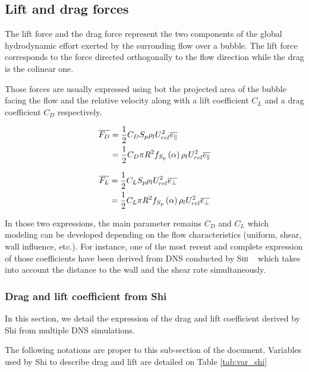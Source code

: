 \subsection{Lift and drag forces}

The lift force and the drag force represent the two components of the global hydrodynamic effort exerted by the surronding flow over a bubble. The lift force corresponds to the force directed orthogonally to the flow direction while the drag is the colinear one. 

\npar
Those forces are usually expressed using bot the projected area of the bubble facing the flow and the relative velocity along with a lift coefficient $C_{L}$ and a drag coefficient $C_{D}$ respectively.


\begin{align}
\overline{F_{D}}&=\frac{1}{2}C_{D}S_{p}\rho_{l}U_{rel}^{2}\overline{e_{\|}}\\
&=\frac{1}{2}C_{D}\pi R^{2}f_{S_{p}}\left( \alpha \right)\rho_{l}U_{rel}^{2}\overline{e_{\|}}
\end{align}


\begin{align}
\overline{F_{L}}&=\frac{1}{2}C_{L}S_{p}\rho_{l}U_{rel}^{2}\overline{e_{\bot}}\\
&=\frac{1}{2}C_{L}\pi R^{2}f_{S_{p}}\left( \alpha \right)\rho_{l}U_{rel}^{2}\overline{e_{\bot}}
\end{align}

In those two expressions, the main parameter remains $C_{D}$ and $C_{L}$ which modeling can be developed depending on the flow characteristics (uniform, shear, wall influence, etc.). For instance, one of the most recent and complete expression of those coefficients have been derived from DNS conducted by \textsc{Shi} \etal~ which takes into account the distance to the wall and the shear rate simultaneously.



\subsubsection{Drag and lift coefficient from Shi \etal}

In this section, we detail the expression of the drag and lift coefficient derived by Shi \etal from multiple DNS simulations.

\npar

The following notations are proper to this sub-section of the document. Variables used by Shi \etal to describe drag and lift are detailed on Table \ref{tab:var_shi}

